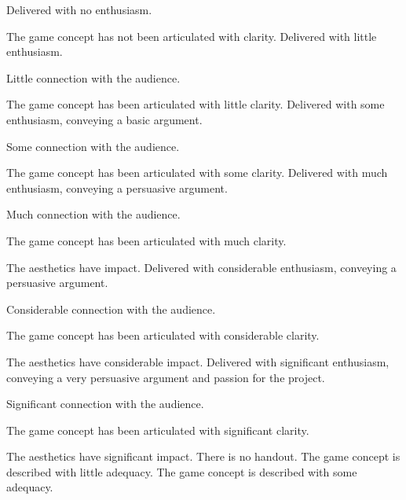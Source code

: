 \documentclass{../fal_assignment}
\begin{document}
\begin{markingrubric}
%
        \grade\fail Delivered with no enthusiasm. 
           \par The game concept has not been articulated with clarity.
        \grade Delivered with little enthusiasm. 
            \par Little connection with the audience.
            \par The game concept has been articulated with little clarity.
        \grade Delivered with some enthusiasm, conveying a basic argument. 
            \par Some connection with the audience.
            \par The game concept has been articulated with some clarity.
        \grade Delivered with much enthusiasm, conveying a persuasive argument. 
            \par Much connection with the audience.
            \par The game concept has been articulated with much clarity.
            \par The aesthetics have impact.
        \grade Delivered with considerable enthusiasm, conveying a persuasive argument. 
            \par Considerable connection with the audience.
            \par The game concept has been articulated with considerable clarity.
            \par The aesthetics have considerable impact.
        \grade Delivered with significant enthusiasm, conveying a very persuasive argument and passion for the project.
            \par Significant connection with the audience.
            \par The game concept has been articulated with significant clarity.
            \par The aesthetics have significant impact.
%
        \grade\fail There is no handout. 
        \grade The game concept is described with little adequacy.
        \grade The game concept is described with some adequacy.

\end{markingrubric}
\end{document}
